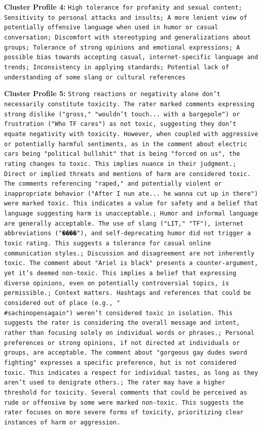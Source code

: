 \documentclass[11pt]{article}
\begin{document}
\textbf{Cluster Profile 4:} \texttt{High tolerance for profanity and sexual content; Sensitivity to personal attacks and insults; A more lenient view of potentially offensive language when used in humor or casual conversation; Discomfort with stereotyping and generalizations about groups; Tolerance of strong opinions and emotional expressions; A possible bias towards accepting casual, internet-specific language and trends; Inconsistency in applying standards; Potential lack of understanding of some slang or cultural references}

\textbf{Cluster Profile 5:} \texttt{Strong reactions or negativity alone don't necessarily constitute toxicity. The rater marked comments expressing strong dislike ("gross," "wouldn't touch... with a bargepole") or frustration ("Who TF cares") as not toxic, suggesting they don't equate negativity with toxicity.  However, when coupled with aggressive or potentially harmful sentiments, as in the comment about electric cars being "political bullshit" that is being "forced on us", the rating changes to toxic. This implies nuance in their judgment.; Direct or implied threats and mentions of harm are considered toxic. The comments referencing "raped," and potentially violent or inappropriate behavior ("After I nun ate... he wanna cut up in there") were marked toxic. This indicates a value for safety and a belief that language suggesting harm is unacceptable.; Humor and informal language are generally acceptable.  The use of slang ("LIT," "TF"), internet abbreviations ("����"), and self-deprecating humor did not trigger a toxic rating. This suggests a tolerance for casual online communication styles.; Discussion and disagreement are not inherently toxic.  The comment about "Ariel is black" presents a counter-argument, yet it's deemed non-toxic. This implies a belief that expressing diverse opinions, even on potentially controversial topics, is permissible.; Context matters. Hashtags and references that could be considered out of place (e.g., "\\#sachinopensagain") weren't considered toxic in isolation.  This suggests the rater is considering the overall message and intent, rather than focusing solely on individual words or phrases.; Personal preferences or strong opinions, if not directed at individuals or groups, are acceptable. The comment about "gorgeous gay dudes sword fighting" expresses a specific preference, but is not considered toxic. This indicates a respect for individual tastes, as long as they aren't used to denigrate others.; The rater may have a higher threshold for toxicity. Several comments that could be perceived as rude or offensive by some were marked non-toxic.  This suggests the rater focuses on more severe forms of toxicity, prioritizing clear instances of harm or aggression.}
\end{document}
